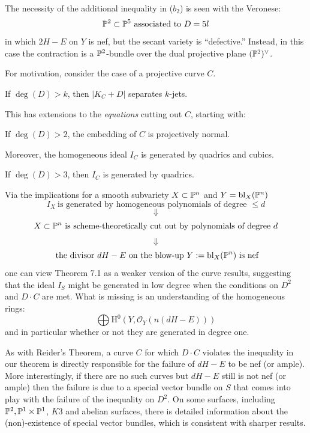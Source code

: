 \documentclass{amsart}
\begin{document}
\medskip

 The necessity of the additional  inequality in ($b_2$) is seen with the Veronese: 
\[ {\mathbb P}^2 \subset {\mathbb P}^5 \ \mbox{associated to} \ D = 5l  \] 
in which $2H - E$ on $Y$ is nef, but the secant variety is ``defective.'' Instead, in this case the contraction is a ${\mathbb P}^2$-bundle over the dual projective plane
$({\mathbb P}^2)^\vee$. 

\medskip

For motivation, consider the case of a projective curve $C$. 

\medskip

  If $\deg(D) > k$, then $|K_C + D|$ separates $k$-jets. 

\medskip

\nt This has extensions to the {\it equations} cutting out $C$, starting with: 

\medskip

  If $\deg(D) > 2$, the embedding of $C$ is projectively normal.

\medskip

Moreover, the homogeneous ideal $I_C$ is generated by quadrics and cubics. 

\medskip

 If $\deg(D) > 3$, then $I_C$ is generated by quadrics. 

\medskip


Via the implications for a smooth subvariety $X \subset {\mathbb P}^n$ and $Y = \mbox{bl}_X({\mathbb P}^n)$ 
\[ I_X \ \mbox{is generated by homogeneous polynomials of degree $\le d$} \] 
\[ \Downarrow \] 
\[ X \subset {\mathbb P}^n \ \mbox{is scheme-theoretically cut out by polynomials of degree $d$} \] 
\[ \Downarrow \] 
\[ \ \mbox{the divisor} \ dH - E \ \mbox{on the blow-up} \ Y := \mbox{bl}_X({\mathbb P}^n) \ \mbox{is nef} \] 
\nt one can view Theorem 7.1 as a weaker version of the curve results, suggesting that the ideal
$I_S$ might be generated in low degree when the conditions on $D^2$ and $D \cdot C$ are met. 
What is missing is an understanding of the homogeneous rings: 
\[ \bigoplus \mbox{H}^0(Y, {\mathcal O}_Y(n(dH - E)))  \] 
and in particular whether or not they are generated in degree one. 

\medskip


As with Reider's Theorem, a curve $C$ for which $D \cdot C$ violates the inequality  in our theorem is directly 
responsible for the
failure of $dH - E$ to be nef (or ample). More interestingly, 
if there are no such curves but $dH - E$ still is not nef (or ample) then the failure is due to a special vector bundle 
on $S$ that comes into play with the failure of the inequality on $D^2$. On some surfaces, including  
${\mathbb P}^2, {\mathbb P}^1 \times {\mathbb P}^1$, $K3$ and abelian surfaces, there is detailed information about the (non)-existence of special vector bundles, 
which is consistent with sharper results.   
\end{document}

